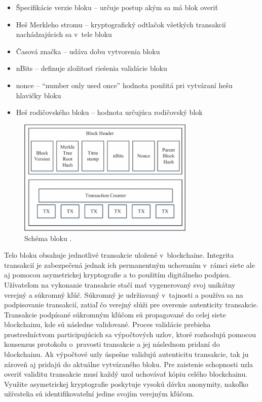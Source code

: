 \begin{itemize}
    \item{Špecifikácie verzie bloku – určuje postup akým sa má blok overiť}
    \item{Heš Merkleho stromu – kryptografický odtlačok všetkých transakcií nachádzajúcich sa v~tele bloku}
    \item{Časová značka – udáva dobu vytvorenia bloku}
    \item{nBits – definuje zložitosť riešenia validácie bloku}
    \item{nonce – “number only used once” hodnota použitá pri vytváraní hešu hlavičky bloku}
    \item{Heš rodičovského bloku – hodnota určujúca rodičovský blok}
\end{itemize}

\begin{figure}[hbt]
	\centering
	\includegraphics[width=0.75\textwidth]{obrazky-figures/block_schema.png}
	\caption{Schéma bloku \cite{blockchain_architecture1}.}
	\label{pic_block_schema}
\end{figure}

Telo bloku obsahuje jednotlivé transakcie uložené v~blockchaine. Integrita transakcií je zabezpečená jednak ich permanentným uchovaním v~rámci siete ale aj pomocou asymetrickej kryptografie a to použitím digitálneho podpisu. Užívateľom na vykonanie transakcie stačí mať vygenerovaný svoj unikátny verejný a súkromný kľúč. Súkromný je udržiavaný v~tajnosti a používa sa na podpisovanie transakcií, zatiaľ čo verejný slúži pre overenie autenticity transakcie. Transakcie podpísané súkromným kľúčom sú propagované do celej siete blockchainu, kde sú následne validované. Proces validácie prebieha prostredníctvom participujúcich sa výpočtových uzlov, ktoré rozhodujú pomocou konsenzus protokolu o~pravosti transakcie a jej následnom pridaní do blockchainu. Ak výpočtové uzly úspešne validujú autenticitu transakcie, tak ju zároveň aj pridajú do aktuálne vytváraného bloku. Pre zaistenie schopnosti uzla overiť validitu transakcie musí každý uzol uchovávať kópiu celého blockchainu. Využite asymetrickej kryptografie poskytuje vysokú dávku anonymity, nakoľko užívatelia sú identifikovateľní jedine svojím verejným kľúčom.


